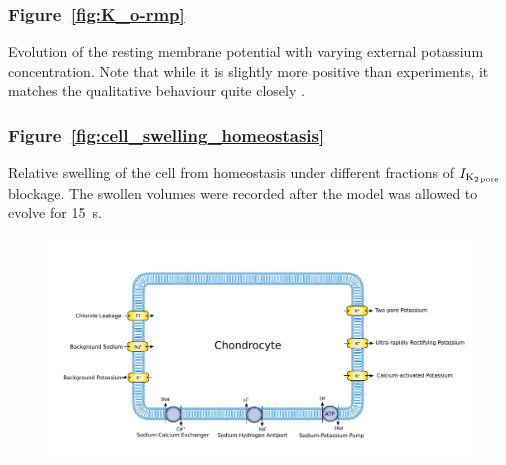 \subsubsection*{Figure~\ref{fig:K_o-rmp}}
Evolution of the resting membrane potential with varying external
potassium concentration. Note that while it is slightly more positive
than experiments, it matches the qualitative behaviour quite
closely \citep{Clarketal2011}.

\subsubsection*{Figure~\ref{fig:cell_swelling_homeostasis}}
Relative swelling of the cell from homeostasis under different
fractions of $I_{\rm K_{2\, pore}}$ blockage. The swollen volumes were
recorded after the model was allowed to evolve for 15~s.

\clearpage
\setlength{\textwidth}{18cm}
\setlength{\oddsidemargin}{0in}
\setlength{\evensidemargin}{0in}

\begin{landscape}
\begin{figure}
  \centering
  \includegraphics[width=\textwidth]
  {../images/pdf/chondrocyte-model-cellml}
  \caption{}
  \label{fig:chondrocyte-model}
\end{figure}
\end{landscape}

